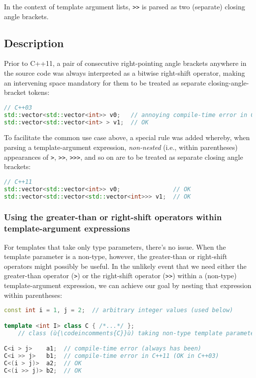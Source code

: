 In the context of template argument lists, \texttt{>>} is parsed as two
(separate) closing angle brackets.

\subsection[Description]{Description}\label{description}

Prior to C++11, a pair of consecutive right-pointing angle brackets anywhere in
the source code was always interpreted as a bitwise right-shift
operator, making an intervening space mandatory for them to be treated
as separate closing-angle-bracket tokens:

\begin{lstlisting}[language=C++]
// C++03
std::vector<std::vector<int>> v0;   // annoying compile-time error in C++03
std::vector<std::vector<int> > v1;  // OK
\end{lstlisting}

\noindent To facilitate the common use case above, a special rule was added
whereby, when parsing a template-argument expression, \emph{non-nested}
(i.e., within parentheses) appearances of \texttt{>}, \texttt{>>},
\texttt{>>>}, and so on are to be treated as separate closing angle brackets:

\begin{lstlisting}[language=C++]
// C++11
std::vector<std::vector<int>> v0;               // OK
std::vector<std::vector<std::vector<int>>> v1;  // OK
\end{lstlisting}
    
\subsubsection[Using the greater-than or right-shift operators within template-argument expressions]{Using the greater-than or right-shift operators within template-argument expressions}\label{using-the-greater-than-or-right-shift-operators-within-template-argument-expressions}

For templates that take only type parameters, there's no issue. When the
template parameter is a non-type, however, the greater-than or right-shift operators might possibly be
useful. In the unlikely event that we need either the greater-than
operator (\texttt{>}) or the right-shift operator (\texttt{>>}) within a
(non-type) template-argument expression, we can achieve our goal by
nesting that expression within parentheses:

\begin{lstlisting}[language=C++]
const int i = 1, j = 2;  // arbitrary integer values (used below)

template <int I> class C { /*...*/ };
    // class (ù{\codeincomments{C}}ù) taking non-type template parameter (ù{\codeincomments{I}}ù) of type (ù{\codeincomments{int}}ù)

C<i > j>    a1;  // compile-time error (always has been)
C<i >> j>   b1;  // compile-time error in C++11 (OK in C++03)
C<(i > j)>  a2;  // OK
C<(i >> j)> b2;  // OK
\end{lstlisting}
    

